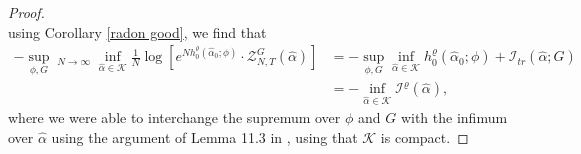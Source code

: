 \documentclass[11pt]{article}
\numberwithin{equation}{section}
\DeclareMathOperator*\uplim{\overline{lim}}
\theoremstyle{definition}
\theoremstyle{plain}
\newcommand{\nn}{\nonumber}
\begin{document}
\begin{proof}
\begin{equation}
    \end{equation}
using Corollary \ref{radon good}, we find that 
    \begin{align}
        \nn- \sup_{\phi,G}  \uplim_{N\to\infty} \inf_{\widehat{\alpha}\in\mathcal{K}} \frac{1}{N}\log \left[ e^{Nh_0^{\varrho}(\widehat{\alpha}_0;\phi)}\cdot \mathcal{Z}_{N,T}^G(\widehat{\alpha}) \right]
        &= -\sup_{\phi,G} \inf_{\widehat{\alpha}\in\mathcal{K}} h_0^{\varrho}(\widehat{\alpha}_0;\phi) + \mathcal{I}_{tr}(\widehat{\alpha};G) \\
        &= -\inf_{\widehat{\alpha} \in \mathcal{K}}\mathcal{I}^{\varrho}(\widehat{\alpha}),
    \end{align}
where we were able to interchange the supremum over $\phi$ and $G$ with the infimum over $\widehat{\alpha}$ using the argument of Lemma 11.3 in \cite{varadhan1984large}, using that $\mathcal{K}$ is compact.  
\end{proof}
\end{document}
